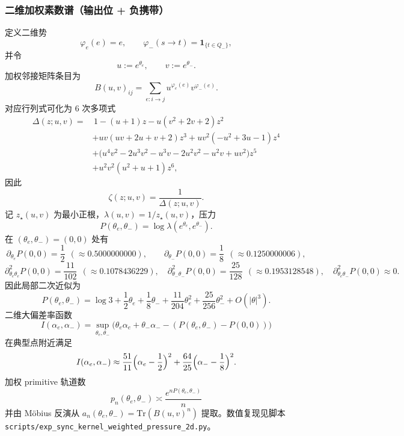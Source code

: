\subsubsection{二维加权素数谱（输出位 + 负携带）}
定义二维势
\[
\varphi_e(e)=e,\qquad \varphi_-(s\to t)=\mathbf{1}_{\{t\in Q_-\}},
\]
并令
\[
u:=e^{\theta_e},\qquad v:=e^{\theta_-}.
\]
加权邻接矩阵条目为
\[
B(u,v)_{ij}=\sum_{e:i\to j}u^{\varphi_e(e)}v^{\varphi_-(e)}.
\]
对应行列式可化为 6 次多项式
\[
\begin{aligned}
\Delta(z;u,v)=&\,1-(u+1)z-u(v^2+2v+2)z^2\\
&+uv(uv+2u+v+2)z^3+uv^2(-u^2+3u-1)z^4\\
&+\bigl(u^4v^2-2u^3v^2-u^3v-2u^2v^2-u^2v+uv^2\bigr)z^5\\
&+u^2v^2(u^2+u+1)z^6,
\end{aligned}
\]
因此
\[
\zeta(z;u,v)=\frac{1}{\Delta(z;u,v)}.
\]
记 $z_\star(u,v)$ 为最小正根，$\lambda(u,v)=1/z_\star(u,v)$，压力
\[
P(\theta_e,\theta_-)=\log\lambda(e^{\theta_e},e^{\theta_-}).
\]
在 $(\theta_e,\theta_-)=(0,0)$ 处有
\[
\partial_{\theta_e}P(0,0)=\frac12\ \ (\approx 0.5000000000),\qquad
\partial_{\theta_-}P(0,0)=\frac18\ \ (\approx 0.1250000006),
\]
\[
\partial^2_{\theta_e\theta_e}P(0,0)=\frac{11}{102}\ \ (\approx 0.1078436229),\quad
\partial^2_{\theta_-\theta_-}P(0,0)=\frac{25}{128}\ \ (\approx 0.1953128548),\quad
\partial^2_{\theta_e\theta_-}P(0,0)\approx 0.
\]
因此局部二次近似为
\[
P(\theta_e,\theta_-)=\log 3+\frac12\theta_e+\frac18\theta_-+\frac{11}{204}\theta_e^2+\frac{25}{256}\theta_-^2+O(|\theta|^3).
\]
二维大偏差率函数
\[
I(\alpha_e,\alpha_-)=\sup_{\theta_e,\theta_-}\bigl(\theta_e\alpha_e+\theta_-\alpha_- - (P(\theta_e,\theta_-)-P(0,0))\bigr)
\]
在典型点附近满足
\[
I(\alpha_e,\alpha_-)\approx \frac{51}{11}\Bigl(\alpha_e-\frac12\Bigr)^2+\frac{64}{25}\Bigl(\alpha_- -\frac18\Bigr)^2.
\]
加权 primitive 轨道数
\[
p_n(\theta_e,\theta_-)\asymp \frac{e^{nP(\theta_e,\theta_-)}}{n}
\]
并由 Möbius 反演从 $a_n(\theta_e,\theta_-)=\mathrm{Tr}(B(u,v)^n)$ 提取。数值复现见脚本 \texttt{scripts/exp\_sync\_kernel\_weighted\_pressure\_2d.py}。

